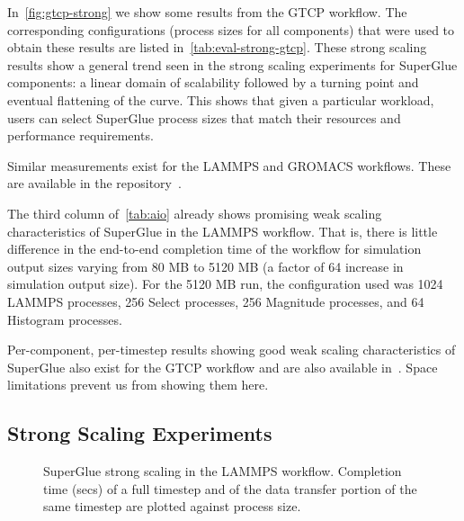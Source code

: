 In~\autoref{fig:gtcp-strong} we show some results 
from the GTCP workflow.
The corresponding configurations (process sizes for all components)
that were used to obtain these results are listed
in~\autoref{tab:eval-strong-gtcp}.
These strong scaling results show a general trend
seen in the strong scaling experiments for SuperGlue
components: a linear domain of scalability followed
by a turning point and eventual flattening
of the curve. This shows
that given
a particular workload, users can select SuperGlue process sizes
that match their resources and performance requirements.

Similar measurements exist for the LAMMPS and GROMACS workflows.
These are available in the repository~\cite{champsaur:superglue-repo}.

The third column of~\autoref{tab:aio} already
shows promising
weak scaling characteristics of SuperGlue
in the LAMMPS workflow. That is, there is little
difference in the end-to-end
completion time of the workflow
for simulation output sizes varying
from 80 MB to 5120 MB (a factor of 64
increase in simulation output size).
For the 5120 MB run, the configuration used
was 1024 LAMMPS processes, 256 Select processes,
256 Magnitude processes, and 64 Histogram processes.

Per-component, per-timestep results
showing good weak scaling characteristics of
SuperGlue
also exist for the GTCP workflow and are also
available in~\cite{champsaur:superglue-repo}.
Space limitations prevent us
from showing them here.

\subsection{Strong Scaling Experiments}


\begin{figure}
  \centering
  \vspace{-0.25in}
  
  \vspace{-0.15in}
  
  \vspace{-0.17in}
  
  \vspace{-0.05in}
  \caption{SuperGlue strong scaling in the LAMMPS workflow.
    Completion time (secs) of a full timestep and of the data transfer
    portion of the same timestep are plotted against process size.}
  \label{fig:lammps-strong}
  \vspace{-0.18in}
\end{figure}

